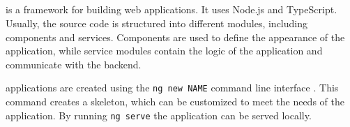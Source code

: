 \subsection{\angular{}}\label{sec:FE_angular}

\angular{} is a framework for building web applications.
It uses Node.js and TypeScript.
Usually, the source code is structured into different modules, including components and services.
Components are used to define the appearance of the application, while
service modules contain the logic of the application and communicate with the backend.

\angular{} applications are created using the \texttt{ng new NAME} command line interface \cite{angular_book2018}.
This command creates a skeleton, which can be customized to meet the needs of the application.
By running \texttt{ng serve} the application can be served locally.